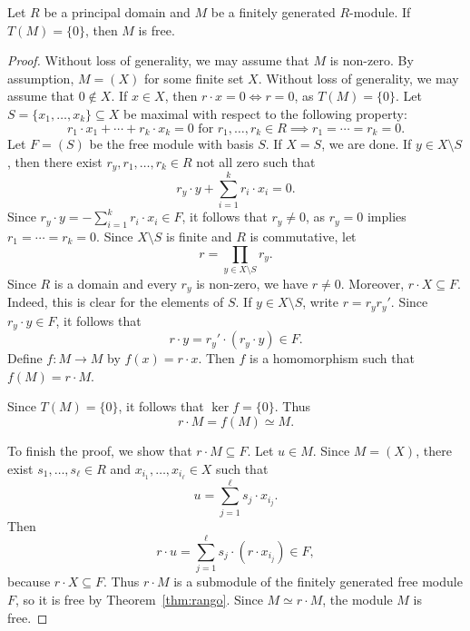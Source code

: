\begin{theorem}
Let $R$ be a principal domain and 
$M$ be a finitely generated $R$-module. If
$T(M)=\{0\}$, then $M$ is free. 
\end{theorem}

\begin{proof}
Without loss of generality, we may assume that $M$ is non-zero.
By assumption, $M=(X)$ for some finite set $X$. Without loss of generality, we may assume that $0\not\in X$. 
If $x\in X$, then $r\cdot x=0\Longleftrightarrow r=0$, as $T(M)=\{0\}$. 
Let $S=\{x_1,\dots,x_k\}\subseteq X$ 
be maximal with respect to the following property:
\[
r_1\cdot x_1+\cdots+r_k\cdot x_k=0\text{ for $r_1,\dots,r_k\in R$}\implies r_1=\cdots=r_k=0.
\]	
Let $F=(S)$ be the free module with basis $S$. If $X=S$, we are done. 
If $y\in X\setminus S$, then
there exist $r_y,r_1,\dots,r_k\in R$ not all zero such that 
\[
r_y\cdot y+\sum_{i=1}^k r_i\cdot x_i=0.
\]
Since $r_y\cdot y=-\sum_{i=1}^k r_i\cdot x_i\in F$, it follows that
$r_y\ne 0$, as  
$r_y=0$ implies $r_1=\cdots=r_k=0$. 
Since $X\setminus S$ is finite and $R$ is commutative, let
\[
r=\prod_{y\in X\setminus S}r_y.
\]
Since $R$ is a domain and every $r_y$ is non-zero, we have
$r\ne0$. Moreover, $r\cdot X\subseteq F$. Indeed, this is clear
for the elements of $S$. If $y\in X\setminus S$, write
$r=r_y r_y'$. Since $r_y\cdot y\in F$, it follows that
\[
r\cdot y=r_y'\cdot(r_y\cdot y)\in F.
\]
Define $f\colon M\to M$ by $f(x)=r\cdot x$. Then
$f$ is a homomorphism such that $f(M)=r\cdot M$.

Since $T(M)=\{0\}$, it follows that
$\ker f=\{0\}$. Thus 
\[
r\cdot M=f(M)\simeq M.
\]

To finish the proof, we show that $r\cdot M\subseteq F$. Let
$u\in M$. Since $M=(X)$, there exist
$s_1,\dots,s_\ell\in R$ and $x_{i_1},\dots,x_{i_\ell}\in X$
such that
\[
u=\sum_{j=1}^{\ell}s_j\cdot x_{i_j}.
\]
Then
\[
r\cdot u
=
\sum_{j=1}^{\ell}s_j\cdot(r\cdot x_{i_j})
\in F,
\]
because $r\cdot X\subseteq F$. Thus $r\cdot M$ is a submodule
of the finitely generated free module $F$, so it is free by
Theorem~\ref{thm:rango}. Since $M\simeq r\cdot M$, the module
$M$ is free.
\end{proof}

